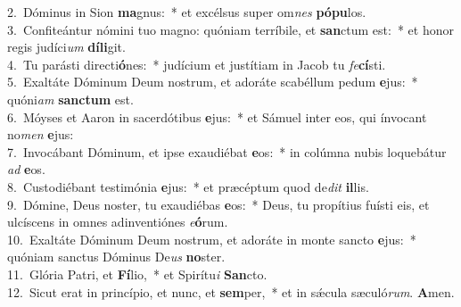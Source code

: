 {2.~}Dóminus in Sion \textbf{ma}gnus:~* et excélsus super om\textit{nes} \textbf{pó}\textbf{pu}los.\\
{3.~}Confiteántur nómini tuo magno: quóniam terríbile, et \textbf{san}ctum est:~* et honor regis judíci\textit{um} \textbf{dí}\textbf{li}git.\\
{4.~}Tu parásti directi\textbf{ó}nes:~* judícium et justítiam in Jacob tu \textit{fe}\textbf{cí}sti.\\
{5.~}Exaltáte Dóminum Deum nostrum, et adoráte scabéllum pedum \textbf{e}jus:~* quóni\textit{am} \textbf{san}\textbf{ctum} est.\\
{6.~}Móyses et Aaron in sacerdótibus \textbf{e}jus:~* et Sámuel inter eos, qui ínvocant no\textit{men} \textbf{e}jus:\\
{7.~}Invocábant Dóminum, et ipse exaudiébat \textbf{e}os:~* in colúmna nubis loquebátur \textit{ad} \textbf{e}os.\\
{8.~}Custodiébant testimónia \textbf{e}jus:~* et præcéptum quod de\textit{dit} \textbf{il}lis.\\
{9.~}Dómine, Deus noster, tu exaudiébas \textbf{e}os:~* Deus, tu propítius fuísti eis, et ulcíscens in omnes adinventiónes \textit{e}\textbf{ó}rum.\\
{10.~}Exaltáte Dóminum Deum nostrum, et adoráte in monte sancto \textbf{e}jus:~* quóniam sanctus Dóminus De\textit{us} \textbf{no}ster.\\
{11.~}Glória Patri, et \textbf{Fí}lio,~* et Spirítu\textit{i} \textbf{San}cto.\\
{12.~}Sicut erat in princípio, et nunc, et \textbf{sem}per,~* et in sǽcula sæculó\textit{rum}. \textbf{A}men.\\
